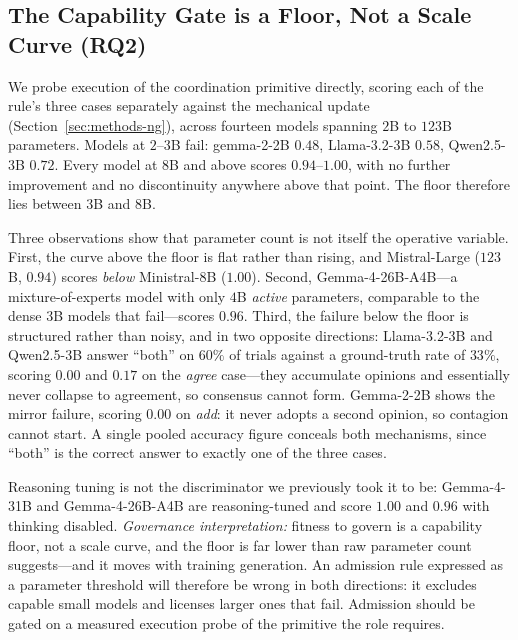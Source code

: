 \documentclass[manuscript,screen,review]{acmart}
\begin{document}
{\color{revblue}%
\subsection{The Capability Gate is a Floor, Not a Scale Curve (RQ2)}
\label{sec:gate}
We probe execution of the coordination primitive directly, scoring each of the
rule's three cases separately against the mechanical update
(Section~\ref{sec:methods-ng}), across fourteen models spanning $2$B to $123$B
parameters. Models at $2$--$3$B fail: gemma-2-2B $0.48$, Llama-3.2-3B $0.58$,
Qwen2.5-3B $0.72$. Every model at $8$B and above scores $0.94$--$1.00$, with no
further improvement and no discontinuity anywhere above that point. The floor
therefore lies between $3$B and $8$B.

Three observations show that parameter count is not itself the operative
variable. First, the curve above the floor is flat rather than rising, and
Mistral-Large ($123$B, $0.94$) scores \emph{below} Ministral-8B ($1.00$). Second,
Gemma-4-26B-A4B---a mixture-of-experts model with only $4$B \emph{active}
parameters, comparable to the dense $3$B models that fail---scores $0.96$. Third,
the failure below the floor is structured rather than noisy, and in two opposite
directions: Llama-3.2-3B and Qwen2.5-3B answer ``both'' on $60\%$ of trials
against a ground-truth rate of $33\%$, scoring $0.00$ and $0.17$ on the
\emph{agree} case---they accumulate opinions and essentially never collapse to
agreement, so consensus cannot form. Gemma-2-2B shows the mirror failure, scoring
$0.00$ on \emph{add}: it never adopts a second opinion, so contagion cannot
start. A single pooled accuracy figure conceals both mechanisms, since ``both''
is the correct answer to exactly one of the three cases.

Reasoning tuning is not the discriminator we previously took it to be: Gemma-4-31B
and Gemma-4-26B-A4B are reasoning-tuned and score $1.00$ and $0.96$ with thinking
disabled. \emph{Governance interpretation:} fitness to govern is a capability
floor, not a scale curve, and the floor is far lower than raw parameter count
suggests---and it moves with training generation. An admission rule expressed as a
parameter threshold will therefore be wrong in both directions: it excludes
capable small models and licenses larger ones that fail. Admission should be
gated on a measured execution probe of the primitive the role requires.
}%
\end{document}
